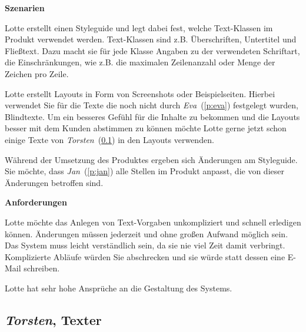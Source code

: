 \begin{multicols}{2}
\textbf{Szenarien}

Lotte erstellt einen Styleguide und legt dabei fest, welche Text-Klassen im Produkt verwendet werden. Text-Klassen sind z.B. Überschriften, Untertitel und Fließtext. Dazu macht sie für jede Klasse Angaben zu der verwendeten Schriftart, die Einschränkungen, wie z.B. die maximalen Zeilenanzahl oder Menge der Zeichen pro Zeile.

Lotte erstellt Layouts in Form von Screenshots oder Beispielseiten. Hierbei verwendet Sie für die Texte die noch nicht durch \emph{Eva}~(\ref{p:eva}) festgelegt wurden, Blindtexte. Um ein besseres Gefühl für die Inhalte zu bekommen und die Layouts besser mit dem Kunden abstimmen zu können möchte Lotte gerne jetzt schon einige Texte von \emph{Torsten}~(\ref{p:torsten}) in den Layouts verwenden.

Während der Umsetzung des Produktes ergeben sich Änderungen am Styleguide. Sie möchte, dass \emph{Jan}~(\ref{p:jan}) alle Stellen im Produkt anpasst, die von dieser Änderungen betroffen sind.

\textbf{Anforderungen}

Lotte möchte das Anlegen von Text-Vorgaben unkompliziert und schnell erledigen können. Änderungen müssen jederzeit und ohne großen Aufwand möglich sein. Das System muss leicht verständlich sein, da sie nie viel Zeit damit verbringt. Komplizierte Abläufe würden Sie abschrecken und sie würde statt dessen eine E-Mail schreiben.

Lotte hat sehr hohe Ansprüche an die Gestaltung des Systems.

\end{multicols}

\pagebreak

\subsection{\emph{Torsten}, Texter}\label{p:torsten}

